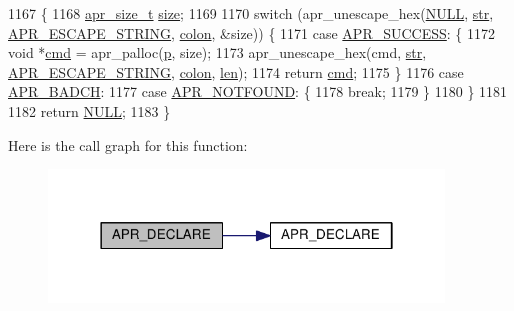 \begin{DoxyCode}
1167 \{
1168     \hyperlink{group__apr__platform_gaaa72b2253f6f3032cefea5712a27540e}{apr\_size\_t} \hyperlink{group__APACHE__CORE__CONFIG_ga2bd3edb50f631a96f1b729fde236ff43}{size};
1169 
1170     \textcolor{keywordflow}{switch} (apr\_unescape\_hex(\hyperlink{pcre_8txt_ad7f989d16aa8ca809a36bc392c07fba1}{NULL}, \hyperlink{group__MOD__DAV_gaab9226fe8f632e1f998e24276d478f30}{str}, \hyperlink{group__APR__Util__Escaping_ga793ae1b187ce490c65eeee2eb59d2831}{APR\_ESCAPE\_STRING}, 
      \hyperlink{group__APR__Util__Escaping_ga6299e50771f9eb5ee423ea0611f1c896}{colon}, &size)) \{
1171     \textcolor{keywordflow}{case} \hyperlink{group__apr__errno_ga9ee311b7bf1c691dc521d721339ee2a6}{APR\_SUCCESS}: \{
1172         \textcolor{keywordtype}{void} *\hyperlink{group__APACHE__CORE__DAEMON_ga504a7f40c3261db3e10e1d2776642dd6}{cmd} = apr\_palloc(\hyperlink{group__APACHE__CORE__MPM_ga5cd91701e5c167f2b1a38e70ab57817e}{p}, size);
1173         apr\_unescape\_hex(cmd, \hyperlink{group__MOD__DAV_gaab9226fe8f632e1f998e24276d478f30}{str}, \hyperlink{group__APR__Util__Escaping_ga793ae1b187ce490c65eeee2eb59d2831}{APR\_ESCAPE\_STRING}, \hyperlink{group__APR__Util__Escaping_ga6299e50771f9eb5ee423ea0611f1c896}{colon}, 
      \hyperlink{group__APACHE__CORE__LOG_gab5a43233d60ef05c5b5bf5cba3d74468}{len});
1174         \textcolor{keywordflow}{return} \hyperlink{group__APACHE__CORE__DAEMON_ga504a7f40c3261db3e10e1d2776642dd6}{cmd};
1175     \}
1176     \textcolor{keywordflow}{case} \hyperlink{group__APR__Error_ga6f3ca71069880d9fe5678687a257d616}{APR\_BADCH}:
1177     \textcolor{keywordflow}{case} \hyperlink{group__APR__Error_ga9bd83273ff02f31f71fb4dc6f29df4a9}{APR\_NOTFOUND}: \{
1178         \textcolor{keywordflow}{break};
1179     \}
1180     \}
1181 
1182     \textcolor{keywordflow}{return} \hyperlink{pcre_8txt_ad7f989d16aa8ca809a36bc392c07fba1}{NULL};
1183 \}
\end{DoxyCode}


Here is the call graph for this function\+:
\nopagebreak
\begin{figure}[H]
\begin{center}
\leavevmode
\includegraphics[width=298pt]{group__apr__hash_ga885401e3c95ab27f7dfb609fbd44e30b_cgraph}
\end{center}
\end{figure}


